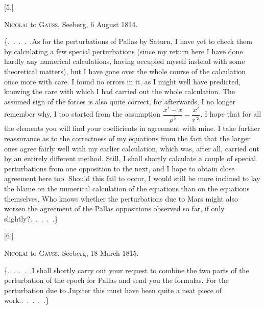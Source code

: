 \clearpage
\begingroup
{}
\renewcommand{\headrulewidth}{0pt}
\par\medskip
{}
\begin{center}
[5.]\par\medskip
\textsc{Nicolai} to \textsc{Gauss}, Seeberg, 6 August 1814.
\end{center}
\par\noindent\hspace*{\parindent}\{.\ .\ .\ .\ .\quad As for the perturbations of Pallas by Saturn, I have
yet to check them by calculating a few special perturbations
(since my return here I have done hardly any
numerical calculations, having occupied myself instead with some theoretical matters),
but I have gone over the whole course of the calculation once more
with care. I found no errors in it, as I might well have
predicted, knowing the care with which I had carried out
the whole calculation. The assumed sign
of the forces is also quite correct, for afterwards,
I no longer remember why, I too started from the assumption
\(\dfrac{x'-x}{\rho^3}-\dfrac{x'}{r^{\prime3}}\). I hope that for all the elements
you will find your coefficients in agreement with mine. I take further
reassurance as to the correctness of my equations from the fact
that the larger ones agree fairly well with my earlier calculation, which
was, after all, carried out by an entirely different method.
Still, I shall shortly calculate a couple of special perturbations from one opposition
to the next, and I hope to obtain close agreement
here too. Should this fail to occur, I would still be more inclined
to lay the blame on the numerical calculation of the equations than on
the equations themselves. Who knows whether the perturbations due to Mars might also worsen
the agreement of the Pallas oppositions observed so far, if only
slightly?\quad .\ .\ .\ .\ .\}

\par\medskip
{}
\begin{center}
[6.]\par\medskip
\textsc{Nicolai} to \textsc{Gauss}, Seeberg, 18 March 1815.
\end{center}
\par\noindent\hspace*{\parindent}\{.\ .\ .\ .\ .\quad I shall shortly carry out your request to combine the two parts
of the perturbation of the epoch for Pallas and send you
the formulas. For the perturbation due to Jupiter this must have been quite
a neat piece of work.\quad .\ .\ .\ .\ .\}

